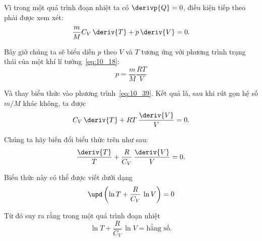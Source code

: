 \noindent

Vì trong một quá trình đoạn nhiệt ta có $\derivp{Q}=0$, điều kiện tiếp theo phải được xem xét: 
\begin{equation}\label{eq:10_39}
	\frac{m}{M}C_V\,\deriv{T} + p\,\deriv{V} = 0.
\end{equation}


Bây giờ chúng ta sẽ biểu diễn $p$ theo $V$ và $T$ tương ứng với phương trình trạng thái của một khí lí tưởng~\eqref{eq:10_18}:
\begin{equation*}
	p = \frac{m}{M}\frac{RT}{V}
\end{equation*}

\noindent

Và thay biểu thức vào phương trình~\eqref{eq:10_39}. Kết quả là, sau khi rút gọn hệ số $m/M$ khác không, ta được  
\begin{equation*}
	C_V\,\deriv{T} + RT\,\frac{\deriv{V}}{V} = 0.
\end{equation*}

\noindent

Chúng ta hãy biến đổi biểu thức trên như sau:
\begin{equation*}
	\frac{\deriv{T}}{T} + \frac{R}{C_V}\,\frac{\deriv{V}}{V} = 0.
\end{equation*}

\noindent

Biểu thức này có thể được viết dưới dạng
\begin{equation*}
	\upd\left(\ln{T} + \frac{R}{C_V}\,\ln{V}\right) = 0
\end{equation*}

\noindent

Từ đó suy ra rằng trong một quá trình đoạn nhiệt
\begin{equation}\label{eq:10_40}
	\ln{T} + \frac{R}{C_V}\,\ln{V} = \text{hằng số}.
\end{equation}


